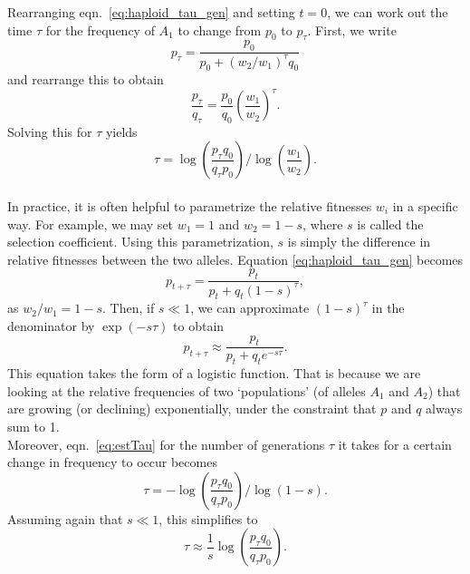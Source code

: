 Rearranging eqn.\ \eqref{eq:haploid_tau_gen} and setting $t = 0$, we can work out the time $\tau$ for the frequency of $A_1$ to change from $p_0$ to $p_{\tau}$. First, we write
\begin{equation}
	p_{\tau} = \frac{p_0}{p_0 + (w_2/w_1)^{\tau} q_0}
\end{equation}
and rearrange this to obtain
\begin{equation}
	\label{eq:estTau}
	\frac{p_{\tau}}{q_{\tau}} = \frac{p_0}{q_0} \left(\frac{w_1}{w_2}\right)^{\tau}.
\end{equation}
Solving this for $\tau$ yields
\begin{equation}
	\label{eq:solTau}
	\tau = \log \left(\frac{p_{\tau} q_0}{q_{\tau} p_0}\right) /  \log\left(  \frac{w_1}{w_2} \right).
\end{equation}
\\

In practice, it is often helpful to parametrize the relative fitnesses $w_i$ in a specific way. For example, we may set $w_1 = 1$ and $w_2 = 1 - s$, where $s$ is called the selection coefficient. Using this parametrization, $s$ is simply the difference in relative fitnesses between the two alleles. Equation \eqref{eq:haploid_tau_gen} becomes
\begin{equation}
	\label{eq:haploid_tau_gen_expl}
	p_{t+\tau} = \frac{p_{t}}{p_{t} + q_{t} (1 - s)^{\tau}},
\end{equation}
as $w_2 / w_1 = 1 - s$. Then, if $s \ll 1$, we can approximate $(1-s)^{\tau}$ in the denominator by $\exp(-s\tau)$ to obtain
\begin{equation} \label{eq:haploid_logistic growth}
	p_{t+\tau} \approx \frac{p_t}{p_t + q_t e^{-s\tau}}.
\end{equation}
This equation takes the form of a logistic function. That is because
we are looking at the relative frequencies of two `populations' (of
alleles $A_1$ and $A_2$) that are growing (or declining)
exponentially, under the constraint that $p$ and $q$ always sum to 1. \\

Moreover, eqn.\ \eqref{eq:estTau} for the number of generations $\tau$ it takes for a certain change in frequency to occur becomes
\begin{equation}
	\label{eq:estTauExpl}
	\tau = - \log \left(\frac{p_{\tau} q_0}{q_{\tau} p_0}\right) /  \log\left(1-s\right).
\end{equation}
Assuming again that $s \ll 1$, this simplifies to
\begin{equation}
	\label{eq:estTauExplSimpl}
	\tau \approx \frac{1}{s} \log \left(\frac{p_{\tau} q_0}{q_{\tau} p_0}\right).
\end{equation}


